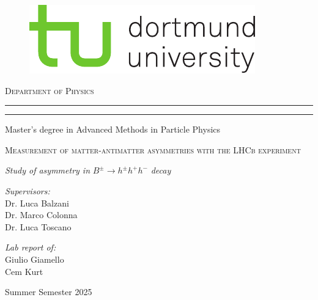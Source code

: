 \begin{titlepage}
	
	\begin{figure}[ht]
		\vspace{-0.5cm} %
		\begin{center}
			\includegraphics[scale=1.50]{tud_logos/logo_tud_english.pdf}
		\end{center}
	\end{figure}

    \vspace{15mm} %
	
	\begin{center}
		{{\large{\textsc{Department of Physics}}}}
		\rule[0.1cm]{\linewidth}{0.3mm} %
		\rule[0.5cm]{\linewidth}{0.3mm} %
		Master’s degree in Advanced Methods in Particle Physics
	\end{center}
	
	\vspace{25mm} %
	\begin{center}
		\begin{Large}
			\textsc{Measurement of matter-antimatter asymmetries with the LHCb experiment}
		\end{Large}
        
        \vspace{5mm} %
        \textit{Study of asymmetry in} $B^{ \pm} \rightarrow h^{ \pm} h^{+} h^{-}$ \textit{decay}
	\end{center}
    
	\vspace{35mm} %
	\noindent
	\begin{minipage}[t]{0.47\textwidth}
		{\large{\textit{Supervisors:}
        \\ Dr. Luca Balzani
        \\ Dr. Marco Colonna
        \\ Dr. Luca Toscano}}
	\end{minipage}
	\hfill
	\begin{minipage}[t]{0.47\textwidth}\raggedleft
		{\large{\textit{Lab report of:}
        \\ Giulio Giamello
        \\Cem Kurt}}
	\end{minipage}
	\vfill
	\vspace{15mm}
	\begin{center}
		{\large{Summer Semester 2025}}
	\end{center}
	\vspace{-2cm}
	
\end{titlepage}
